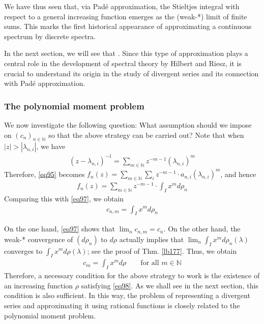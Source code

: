 \documentclass[12pt,b5paper,notitlepage]{article}
\theoremstyle{definition}
\theoremstyle{plain}
\newcommand{\Nbb}{\mathbb N}
\numberwithin{equation}{section}
\begin{document}
We have thus seen that, via Pad\'e approximation, the Stieltjes integral with respect to a general increasing function emerges as the (weak-*) limit of finite sums. This marks the first historical appearance of approximating a continuous spectrum by discrete spectra.


In the next section, we will see that . Since this type of approximation plays a central role in the development of spectral theory by Hilbert and Riesz, it is crucial to understand its origin in the study of divergent series and its connection with Pad\'e approximation.


\subsubsection{The polynomial moment problem}\label{lb184}




We now investigate the following question: What assumption should we impose on $(c_n)_{n\in\Nbb}$ so that the above strategy can be carried out? Note that when $|z|>|\lambda_{n,i}|$, we have
\begin{align*}
(z-\lambda_{n,i})^{-1}=\sum_{m\in\Nbb} z^{-m-1}(\lambda_{n,i})^m
\end{align*}
Therefore, \eqref{eq95} becomes $f_n(z)=\sum_{m\in\Nbb}\sum_i z^{-m-1}\cdot a_{n,i}(\lambda_{n,i})^m$, and hence
\begin{align*}
f_n(z)=\sum_{m\in\Nbb}z^{-m-1}\cdot\int_I x^md\rho_n
\end{align*}
Comparing this with \eqref{eq97}, we obtain
\begin{align*}
c_{n,m}=\int_I x^m d\rho_n
\end{align*}

On the one hand, \eqref{eq97} shows that $\lim_n c_{n,m}=c_n$. On the other hand, the weak-* convergence of $(d\rho_n)$ to $d\rho$ actually implies that $\lim_n\int_I x^m d\rho_n(\lambda)$ converges to $\int_I x^m d\rho(\lambda)$; see the proof of Thm. \ref{lb177}. Thus, we obtain
\begin{align}\label{eq98}
c_m=\int_I x^md\rho\qquad\text{for all }m\in\Nbb
\end{align}
Therefore, a necessary condition for the above strategy to work is the existence of an increasing function $\rho$ satisfying \eqref{eq98}. As we shall see in the next section, this condition is also sufficient. In this way, the problem of representing a divergent series and approximating it using rational functions is closely related to the polynomial moment problem.
\end{document}
